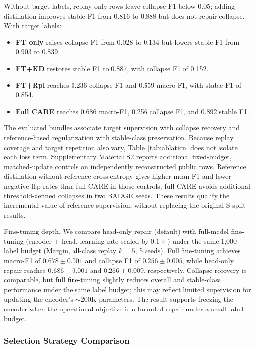 \documentclass[journal]{IEEEtran}
\newcommand{\ours}{CARE}  %
\begin{document}
Without target labels, replay-only rows leave collapse F1 below 0.05; adding distillation improves stable F1 from 0.816 to 0.888 but does not repair collapse. With target labels:
\begin{itemize}
  \item \textbf{FT only} raises collapse F1 from 0.028 to 0.134 but lowers stable F1 from 0.903 to 0.839.
  \item \textbf{FT+KD} restores stable F1 to 0.887, with collapse F1 of 0.152.
  \item \textbf{FT+Rpl} reaches 0.236 collapse F1 and 0.659 macro-F1, with stable F1 of 0.854.
  \item \textbf{Full \ours{}} reaches 0.686 macro-F1, 0.256 collapse F1, and 0.892 stable F1.
\end{itemize}
The evaluated bundles associate target supervision with collapse recovery and reference-based regularization with stable-class preservation. Because replay coverage and target repetition also vary, Table~\ref{tab:ablation} does not isolate each loss term. Supplementary Material S2 reports additional fixed-budget, matched-update controls on independently reconstructed public rows. Reference distillation without reference cross-entropy gives higher mean F1 and lower negative-flip rates than full CARE in those controls; full CARE avoids additional threshold-defined collapses in two BADGE seeds. These results qualify the incremental value of reference supervision, without replacing the original S-split results.

Fine-tuning depth.
We compare head-only repair (default) with full-model fine-tuning (encoder + head, learning rate scaled by $0.1{\times}$) under the same 1{,}000-label budget (Margin, all-class replay $k{=}5$, 5 seeds).
Full fine-tuning achieves macro-F1 of $0.678{\pm}0.001$ and collapse F1 of $0.256{\pm}0.005$, while head-only repair reaches $0.686{\pm}0.001$ and $0.256{\pm}0.009$, respectively.
Collapse recovery is comparable, but full fine-tuning slightly reduces overall and stable-class performance under the same label budget; this may reflect limited supervision for updating the encoder's ${\sim}$200K parameters.
The result supports freezing the encoder when the operational objective is a bounded repair under a small label budget.

\subsubsection{Selection Strategy Comparison}
\label{sec:al_baselines}
\end{document}
